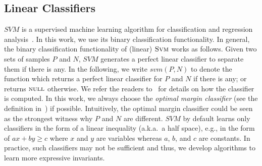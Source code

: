 \subsection{Linear Classifiers}
$\mathit{SVM}$ is a supervised machine learning algorithm for classification and regression analysis~\cite{svm:original}.
In this work, we use its binary classification functionality.
In general, the binary classification functionality of (linear) $\textsc{Svm}$ works as follows.
Given two sets of samples $P$ and $N$, $\mathit{SVM}$ generates a perfect linear classifier to separate them if there is any.
In the following, we write $\mathit{svm}(P, N)$ to denote the function which returns a perfect linear classifier for $P$ and $N$ if there is any;
or returns $\textsc{null}$ otherwise.
We refer the readers to~\cite{svm:smo} for details on how the classifier is computed.
In this work, we always choose the \textit{optimal margin classifier} (see the definition in~\cite{sharma2012interpolants}) if possible.
Intuitively, the optimal margin classifier could be seen as the strongest witness why $P$ and $N$ are different.
$\mathit{SVM}$ by default learns only classifiers in the form of a linear inequality (a.k.a.~a half space),
e.g., in the form of $\mathit{a x + b y \geq c}$ where $x$ and $y$ are variables whereas $a$, $b$, and $c$ are constants.
In practice, such classifiers may not be sufficient and thus, we develop algorithms to learn more expressive invariants.

